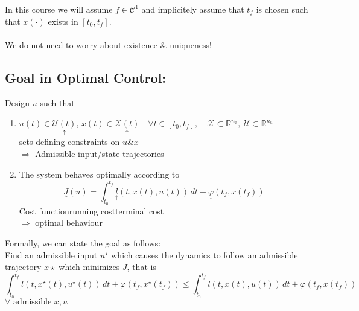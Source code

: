 \documentclass[12pt,a4paper,oneside]{scrartcl}
\begin{document}
	In this course we will assume $f \in\mathcal{C}^1$ and implicitely assume that $t_f$ is chosen such that $x(\cdot)$ exists in $[t_0,t_f]$. \\\\
	We do not need to worry about existence \& uniqueness!
	
	\subsection*{Goal in Optimal Control:}
	Design $u$ such that
	\begin{enumerate}
		\item $u(t) \in \underset{\uparrow}{\mathcal{U}(t)}$, $x(t) \in \underset{\uparrow}{\mathcal{X}(t)} \quad \forall t \in [t_0,t_f], \quad \mathcal{X}\subset\mathbb{R}^{n_x}, \ \mathcal{U}\subset\mathbb{R}^{n_u}$\\
			sets defining constraints on $u \& x$ \\
			\hspace*{10mm}$\Rightarrow$ Admissible input/state trajectories
		\item
			The system behaves optimally according to
			\[
			\underset{\uparrow}{J}(u) = \int_{t_0}^{t_f} \underset{\uparrow}{l}(t,x(t),u(t))\,dt + \underset{\uparrow}{\varphi}(t_f,x(t_f))
			\]
			\hspace*{18mm}Cost function\hspace*{10mm}running cost\hspace*{10mm}terminal cost\\
			\hspace*{10mm}$\Rightarrow$ optimal behaviour
	\end{enumerate}
	
	Formally, we can state the goal as follows: \\
	Find an admissible input $u^\star$ which causes the dynamics to follow an admissible trajectory $x\star$ which minimizes $J$, that is
	\[
	\int_{t_0}^{t_f} l(t,x^\star(t),u^\star(t))\,dt + \varphi(t_f,x^\star(t_f)) \leq \int_{t_0}^{t_f} l(t,x(t),u(t))\,dt + \varphi(t_f,x(t_f))
	\]
	\hspace*{100mm}$\forall \text{ admissible } x,u$
	
\end{document}
